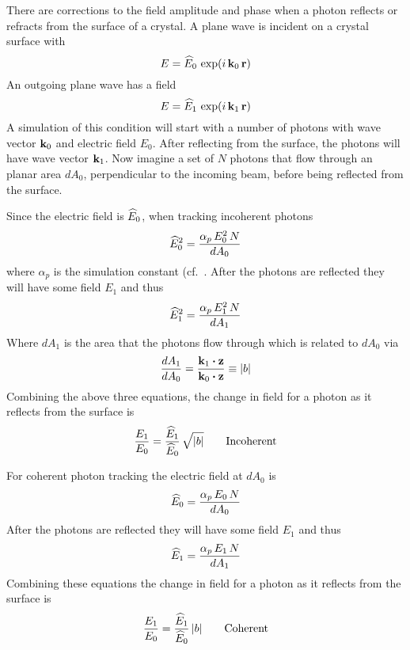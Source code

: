 There are corrections to the field amplitude and phase when a photon reflects or refracts from the
surface of a crystal. A plane wave is incident on a crystal surface with
\begin{equation}
  E = \widehat E_0 \, \exp(i \, {\bf k}_0 \, {\bf r})
\end{equation}
An outgoing plane wave has a field
\begin{equation}
  E = \widehat E_1 \, \exp(i \, {\bf k}_1 \, {\bf r})
\end{equation}
A simulation of this condition will start with a number of photons with wave vector ${\bf k}_0$ and
electric field $E_0$. After reflecting from the surface, the photons will have wave vector
${\bf k}_1$. Now imagine a set of $N$ photons that flow through an planar area $dA_0$, perpendicular to
the incoming beam, before being reflected from the surface.

Since the electric field is $\widehat E_0$, when tracking incoherent photons
\begin{equation}
  \widehat E_0^2 = \frac{\alpha_p \, E_0^2 \, N}{dA_0}
\end{equation}
where $\alpha_p$ is the simulation constant (cf.~. 
After the photons are reflected they will have some field $E_1$ and thus
\begin{equation}
  \widehat E_1^2 = \frac{\alpha_p \, E_1^2 \, N}{dA_1}
\end{equation}
Where $dA_1$ is the area that the photons flow through which is related
to $dA_0$ via
\begin{equation}
  \frac{dA_1}{dA_0} = \frac{{\bf k}_1 \mathbin{\boldsymbol{\cdot}} {\bf z}}{{\bf k}_0 \mathbin{\boldsymbol{\cdot}} {\bf z}} \equiv |b|
\end{equation}
Combining the above three equations, the change in field for a photon
as it reflects from the surface is
\begin{equation}
  \frac{E_1}{E_0} = \frac{\widehat E_1}{\widehat E_0} \, \sqrt{|b|} 
  \qquad \text{Incoherent}
\end{equation}

For coherent photon tracking the electric field at $dA_0$ is
\begin{equation}
  \widehat E_0 = \frac{\alpha_p \, E_0 \, N}{dA_0}
\end{equation}
After the photons are reflected they will have some field $E_1$ and thus
\begin{equation}
  \widehat E_1 = \frac{\alpha_p \, E_1 \, N}{dA_1}
\end{equation}
Combining these equations the change in field for a photon
as it reflects from the surface is
\begin{equation}
  \frac{E_1}{E_0} = \frac{\widehat E_1}{\widehat E_0} \, |b| 
  \qquad \text{Coherent}
\end{equation}

